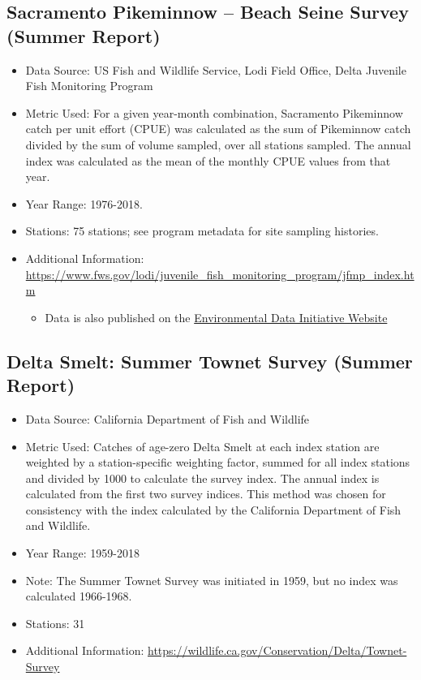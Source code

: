 \documentclass[
]{book}
\providecommand{\tightlist}{%
  \setlength{\itemsep}{0pt}\setlength{\parskip}{0pt}}
\begin{document}
\hypertarget{sacramento-pikeminnow-beach-seine-survey-summer-report}{%
\subsection{Sacramento Pikeminnow -- Beach Seine Survey (Summer Report)}\label{sacramento-pikeminnow-beach-seine-survey-summer-report}}

\begin{itemize}
\tightlist
\item
  Data Source: US Fish and Wildlife Service, Lodi Field Office, Delta Juvenile Fish Monitoring Program
\item
  Metric Used: For a given year-month combination, Sacramento Pikeminnow catch per unit effort (CPUE) was calculated as the sum of Pikeminnow catch divided by the sum of volume sampled, over all stations sampled. The annual index was calculated as the mean of the monthly CPUE values from that year.
\item
  Year Range: 1976-2018.
\item
  Stations: 75 stations; see program metadata for site sampling histories.
\item
  Additional Information: \url{https://www.fws.gov/lodi/juvenile_fish_monitoring_program/jfmp_index.htm}

  \begin{itemize}
  \tightlist
  \item
    Data is also published on the \href{https://portal.edirepository.org/nis/mapbrowse?packageid=edi.244.4}{Environmental Data Initiative Website}
  \end{itemize}
\end{itemize}

\hypertarget{delta-smelt-summer-townet-survey-summer-report}{%
\subsection{Delta Smelt: Summer Townet Survey (Summer Report)}\label{delta-smelt-summer-townet-survey-summer-report}}

\begin{itemize}
\tightlist
\item
  Data Source: California Department of Fish and Wildlife
\item
  Metric Used: Catches of age-zero Delta Smelt at each index station are weighted by a station-specific weighting factor, summed for all index stations and divided by 1000 to calculate the survey index. The annual index is calculated from the first two survey indices. This method was chosen for consistency with the index calculated by the California Department of Fish and Wildlife.
\item
  Year Range: 1959-2018
\item
  Note: The Summer Townet Survey was initiated in 1959, but no index was calculated 1966-1968.
\item
  Stations: 31
\item
  Additional Information: \url{https://wildlife.ca.gov/Conservation/Delta/Townet-Survey}
\end{itemize}
\end{document}
